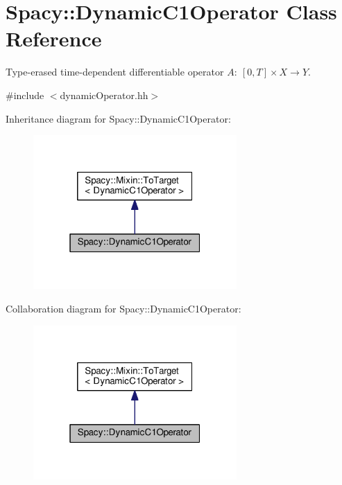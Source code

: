 \hypertarget{classSpacy_1_1DynamicC1Operator}{}\section{Spacy\+:\+:Dynamic\+C1\+Operator Class Reference}
\label{classSpacy_1_1DynamicC1Operator}


Type-\/erased time-\/dependent differentiable operator $A:\ [0,T] \times X \to Y $.  




{\ttfamily \#include $<$dynamic\+Operator.\+hh$>$}



Inheritance diagram for Spacy\+:\+:Dynamic\+C1\+Operator\+:\nopagebreak
\begin{figure}[H]
\begin{center}
\leavevmode
\includegraphics[width=220pt]{classSpacy_1_1DynamicC1Operator__inherit__graph}
\end{center}
\end{figure}


Collaboration diagram for Spacy\+:\+:Dynamic\+C1\+Operator\+:\nopagebreak
\begin{figure}[H]
\begin{center}
\leavevmode
\includegraphics[width=220pt]{classSpacy_1_1DynamicC1Operator__coll__graph}
\end{center}
\end{figure}
